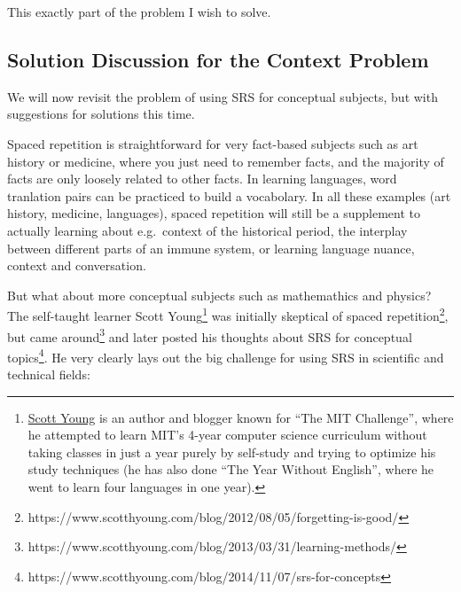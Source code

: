 This exactly part of the problem I wish to solve.

\subsection{Solution Discussion for the Context
Problem}\label{solution-discussion-for-the-context-problem}

We will now revisit the problem of using SRS for conceptual subjects,
but with suggestions for solutions this time.

Spaced repetition is straightforward for very fact-based subjects such
as art history or medicine, where you just need to remember facts, and
the majority of facts are only loosely related to other facts. In
learning languages, word tranlation pairs can be practiced to build a
vocabolary. In all these examples (art history, medicine, languages),
spaced repetition will still be a supplement to actually learning about
e.g.~context of the historical period, the interplay between different
parts of an immune system, or learning language nuance, context and
conversation.

But what about more conceptual subjects such as mathemathics and
physics? The self-taught learner Scott Young\footnote{\href{https://www.scotthyoung.com/}{Scott
  Young} is an author and blogger known for ``The MIT Challenge'', where
  he attempted to learn MIT's 4-year computer science curriculum without
  taking classes in just a year purely by self-study and trying to
  optimize his study techniques (he has also done ``The Year Without
  English'', where he went to learn four languages in one year).} was
initially skeptical of spaced repetition\footnote{https://www.scotthyoung.com/blog/2012/08/05/forgetting-is-good/},
but came around\footnote{https://www.scotthyoung.com/blog/2013/03/31/learning-methods/}
and later posted his thoughts about SRS for conceptual topics\footnote{https://www.scotthyoung.com/blog/2014/11/07/srs-for-concepts}.
He very clearly lays out the big challenge for using SRS in scientific
and technical fields:

